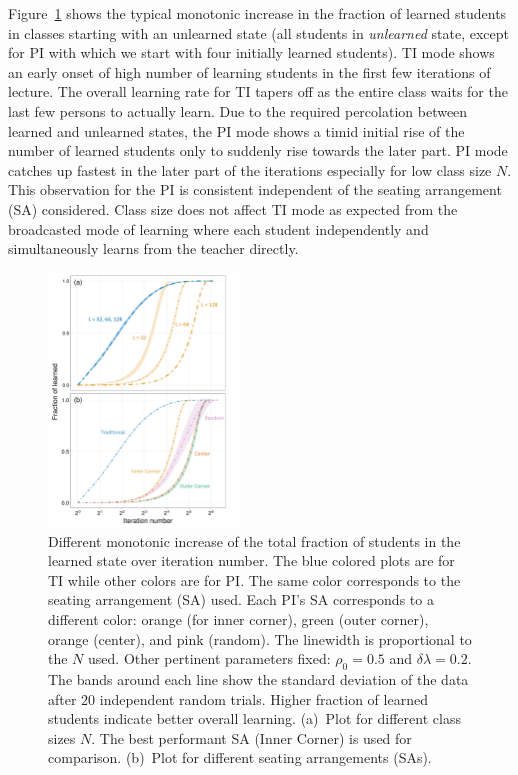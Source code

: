 \documentclass[twocolumn,secnumarabic,amssymb, nobibnotes, aps, prd]{revtex4-2}
\begin{document}
        Figure~\ref{fig:comparison size} shows the typical monotonic increase in the fraction of learned students in classes starting with an unlearned state (all students in {\it unlearned} state, except for PI with which we start with four initially learned students).
        TI mode shows an early onset of high number of learning students in the first few iterations of lecture.
        The overall learning rate for TI tapers off as the entire class waits for the last few persons to actually learn.
        Due to the required percolation between learned and unlearned states, the PI mode shows a timid initial rise of the number of learned students only to suddenly rise towards the later part.
        PI mode catches up fastest in the later part of the iterations especially for low class size $N$.
        This observation for the PI is consistent independent of the seating arrangement (SA) considered.
        Class size does not affect TI mode as expected from the broadcasted mode of learning where each student independently and simultaneously learns from the teacher directly.
        \begin{figure}[htbp]
        \centering
        \includegraphics[width=0.45\textwidth]{figures/figure-3.png}
        \caption{
        Different monotonic increase of the total fraction of students in the learned state over iteration number.
        The blue colored plots are for TI while other colors are for PI.
        The same color corresponds to the seating arrangement (SA) used.
        Each PI's SA corresponds to a different color: orange (for inner corner), green (outer corner), orange (center), and pink (random).
        The linewidth is proportional to the $N$ used. Other pertinent parameters fixed: $\rho_0=0.5$ and $\delta\!\lambda=0.2$.
        The bands around each line show the standard deviation of the data after $20$ independent random trials.
        Higher fraction of learned students indicate better overall learning.
        (a)~Plot for different class sizes $N$.
        The best performant SA (Inner Corner) is used for comparison.
        (b)~Plot for different seating arrangements (SAs).
                }
        \label{fig:comparison size}
        \end{figure}
        
\end{document}
